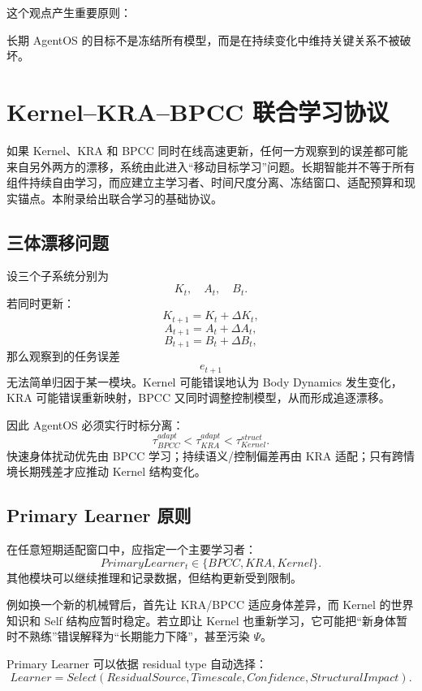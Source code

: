 这个观点产生重要原则：
\begin{statementbox}
\centering
{}
\end{statementbox}
长期 AgentOS 的目标不是冻结所有模型，而是在持续变化中维持关键关系不被破坏。


\chapter{Kernel--KRA--BPCC 联合学习协议}
\label{app:colearning}

\begin{chapterlead}
如果 Kernel、KRA 和 BPCC 同时在线高速更新，任何一方观察到的误差都可能来自另外两方的漂移，系统由此进入“移动目标学习”问题。长期智能并不等于所有组件持续自由学习，而应建立主学习者、时间尺度分离、冻结窗口、适配预算和现实锚点。本附录给出联合学习的基础协议。
\end{chapterlead}

\section{三体漂移问题}

设三个子系统分别为
\[
K_t,\quad A_t,\quad B_t.
\]
若同时更新：
\[
K_{t+1}=K_t+\Delta K_t,
\]
\[
A_{t+1}=A_t+\Delta A_t,
\]
\[
B_{t+1}=B_t+\Delta B_t,
\]
那么观察到的任务误差
\[
e_{t+1}
\]
无法简单归因于某一模块。Kernel 可能错误地认为 Body Dynamics 发生变化，KRA 可能错误重新映射，BPCC 又同时调整控制模型，从而形成追逐漂移。

因此 AgentOS 必须实行时标分离：
\[
\boxed{
\tau_{BPCC}^{adapt}
<
\tau_{KRA}^{adapt}
<
\tau_{Kernel}^{struct}.
}
\]
快速身体扰动优先由 BPCC 学习；持续语义/控制偏差再由 KRA 适配；只有跨情境长期残差才应推动 Kernel 结构变化。

\section{Primary Learner 原则}

在任意短期适配窗口中，应指定一个主要学习者：
\[
PrimaryLearner_t
\in
\{BPCC,KRA,Kernel\}.
\]
其他模块可以继续推理和记录数据，但结构更新受到限制。

例如换一个新的机械臂后，首先让 KRA/BPCC 适应身体差异，而 Kernel 的世界知识和 Self 结构应暂时稳定。若立即让 Kernel 也重新学习，它可能把“新身体暂时不熟练”错误解释为“长期能力下降”，甚至污染 $\Psi$。

Primary Learner 可以依据 residual type 自动选择：
\[
Learner
=
Select(
ResidualSource,
Timescale,
Confidence,
StructuralImpact
).
\]

